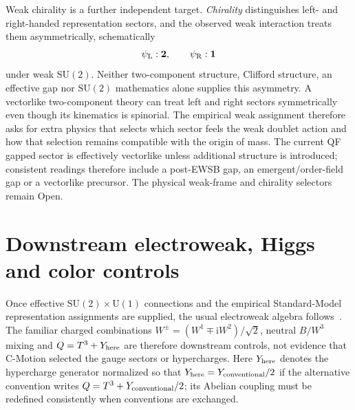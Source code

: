 \documentclass[11pt]{article}
\theoremstyle{definition}
\newcommand{\ii}{\mathrm{i}}
\newcommand{\Uone}{\mathrm{U}(1)}
\newcommand{\SUtwo}{\mathrm{SU}(2)}
\begin{document}
Weak chirality is a further independent target.  \emph{Chirality} distinguishes left- and right-handed representation sectors, and the observed weak interaction treats them asymmetrically, schematically
\begin{equation}
 \psi_{\rm L}:\mathbf2,
 \qquad
 \psi_{\rm R}:\mathbf1
 \label{eq:chiral_target}
\end{equation}
under weak $\SUtwo$.  Neither two-component structure, Clifford structure, an effective gap nor $\SUtwo$ mathematics alone supplies this asymmetry.  A vectorlike two-component theory can treat left and right sectors symmetrically even though its kinematics is spinorial.  The empirical weak assignment therefore asks for extra physics that selects which sector feels the weak doublet action and how that selection remains compatible with the origin of mass.  The current QF gapped sector is effectively vectorlike unless additional structure is introduced; consistent readings therefore include a post-EWSB gap, an emergent/order-field gap or a vectorlike precursor.  The physical weak-frame and chirality selectors remain Open.

\section{Downstream electroweak, Higgs and color controls}
\label{sec:downstream_controls}

Once effective $\SUtwo\times\Uone$ connections and the empirical Standard-Model representation assignments are supplied, the usual electroweak algebra follows~\cite{Glashow1961,Weinberg1967,Salam1968}.  The familiar charged combinations $W^\pm=(W^1\mp\ii W^2)/\sqrt2$, neutral $B/W^3$ mixing and $Q=T^3+Y_{\rm here}$ are therefore downstream controls, not evidence that C-Motion selected the gauge sectors or hypercharges.  Here $Y_{\rm here}$ denotes the hypercharge generator normalized so that $Y_{\rm here}=Y_{\rm conventional}/2$ if the alternative convention writes $Q=T^3+Y_{\rm conventional}/2$; its Abelian coupling must be redefined consistently when conventions are exchanged.
\end{document}
